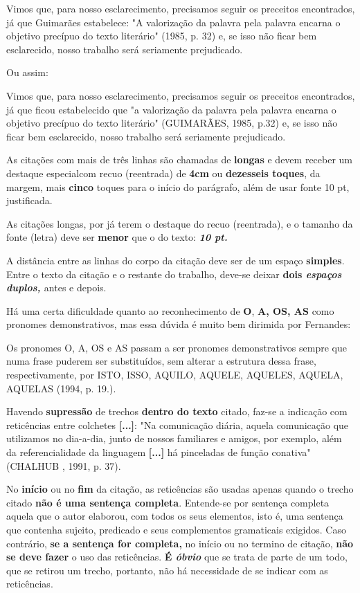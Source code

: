 \documentclass[rel_mlp]{iiufrgs}
\newenvironment{citacao}{
    \small
    \begin{list}{}{
        \setlength{\leftmargin}{4.0cm}
        \setstretch{1}
        \setlength{\topsep}{1.2cm}
        \setlength{\listparindent}{\parindent}
    }
    \item[]}{\end{list}
}
\begin{document}
Vimos que, para nosso esclarecimento, precisamos seguir os preceitos encontrados, já que Guimarães estabelece: "A valorização da palavra pela palavra encarna o objetivo precípuo do texto literário" (1985, p. 32) e, se isso não ficar bem esclarecido, nosso trabalho será seriamente prejudicado.

Ou assim:

Vimos que, para nosso esclarecimento, precisamos seguir os preceitos encontrados, já que ficou estabelecido que "a valorização da palavra pela palavra encarna o objetivo precípuo do texto literário" (GUIMARÃES, 1985, p.32) e, se isso não ficar bem esclarecido, nosso trabalho será seriamente prejudicado.

As citações com mais de três linhas são chamadas de {\bf longas }e devem receber um destaque especial{\bf  }com recuo (reentrada) de {\bf 4cm }ou {\bf dezesseis toques}, da margem, mais {\bf cinco }toques para o início do parágrafo, além de usar fonte 10 pt, justificada.

As citações longas, por já terem o destaque do recuo (reentrada), {\bf {}} e o tamanho da fonte (letra) deve ser {\bf menor }que o do texto: {\bf {\it 10 pt.}}

A distância entre as linhas do corpo da citação deve ser de um espaço {\bf simples}. Entre o texto da citação e o restante do trabalho, deve-se deixar {\bf dois {\it espaços duplos, }}antes e depois.

Há uma certa dificuldade quanto ao reconhecimento de {\bf O}, {\bf A, OS, AS }como pronomes demonstrativos, mas essa dúvida é muito bem dirimida por Fernandes:

\begin{citacao}
Os pronomes O, A, OS e AS passam a ser pronomes demonstrativos sempre que numa frase puderem ser substituídos, sem alterar a estrutura dessa frase, respectivamente, por ISTO, ISSO, AQUILO, AQUELE, AQUELES, AQUELA, AQUELAS (1994, p. 19.).
\end{citacao}


Havendo {\bf supressão }de trechos {\bf dentro do texto }citado, faz-se a indicação com reticências entre colchetes {\bf [...]}: "Na comunicação diária, aquela comunicação que utilizamos no dia-a-dia, junto de nossos familiares e amigos, por exemplo, além da referencialidade da linguagem {\bf [...]} há pinceladas de função conativa" (CHALHUB , 1991, p. 37).

No {\bf início }ou no {\bf fim }da citação, as reticências são usadas apenas quando o trecho citado {\bf não é uma sentença completa}. Entende-se por sentença completa aquela que o autor elaborou, com todos os seus elementos, isto é, uma sentença que contenha sujeito, predicado e seus complementos gramaticais exigidos. Caso contrário, {\bf se a sentença for completa, }no início ou no termino de citação, {\bf não se deve fazer }o uso das reticências. {\bf É {\it óbvio}} que se trata de parte de um todo, que se retirou um trecho, portanto, não há necessidade de se indicar com as reticências.
\end{document}
